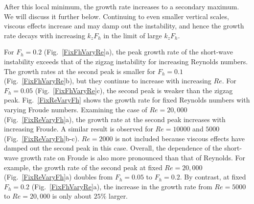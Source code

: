 After this local minimum, the growth rate increases to a secondary maximum. We will discuss it further below. Continuing to even smaller vertical scales, viscous effects increase and may damp out the instability, and hence the growth rate decays with increasing $k_{z}F_{h}$ in the limit of large $k_{z}F_{h}$. 

For $F_{h}=0.2$ (Fig.~\ref{FixFhVaryRe}a), the peak growth rate of the short-wave instability exceeds that of the zigzag instability for increasing Reynolds numbers. The growth rates at the second peak is smaller for $F_{h}=0.1$ (Fig.~\ref{FixFhVaryRe}b), but they continue to increase with increasing $Re$. For $F_{h}=0.05$ (Fig.~\ref{FixFhVaryRe}c), the second peak is weaker than the zigzag peak. Fig.~\ref{FixReVaryFh} shows the growth rate for fixed Reynolds numbers with varying Froude numbers. Examining the case of $Re=20{,}000$ (Fig.~\ref{FixReVaryFh}a), the growth rate at the second peak increases with increasing Froude. A similar result is observed for $Re=10000$ and $5000$ (Fig.~\ref{FixReVaryFh}b-c). $Re=2000$ is not included because viscous effects have damped out the second peak in this case. Overall, the dependence of the short-wave growth rate on Froude is also more pronounced than that of Reynolds. For example, the growth rate of the second peak at fixed $Re=20{,}000$ (Fig.~\ref{FixReVaryFh}a) doubles from $F_{h}=0.05$ to $F_{h}=0.2$. By contrast, at fixed $F_{h}=0.2$ (Fig.~\ref{FixFhVaryRe}a), the increase in the growth rate from $Re=5000$ to $Re=20{,}000$ is only about $25\%$ larger. 


